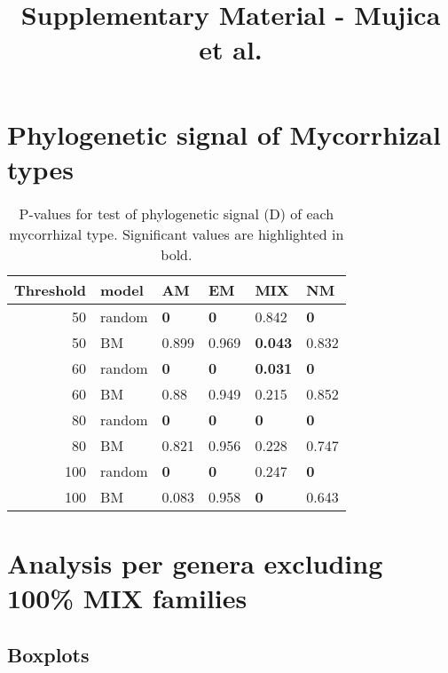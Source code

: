\documentclass[]{article}
\title{Supplementary Material - Mujica et al.}
\author{}
\date{}
\begin{document}
\maketitle

\hypertarget{phylogenetic-signal-of-mycorrhizal-types}{%
\section{Phylogenetic signal of Mycorrhizal
types}\label{phylogenetic-signal-of-mycorrhizal-types}}

\begin{table}[H]

\caption{\label{tab:unnamed-chunk-2}P-values for test of phylogenetic signal (D) of each mycorrhizal type. Significant values are highlighted in bold.}
\centering
\begin{tabular}{r|l|l|l|l|l}
\hline
Threshold & model & AM & EM & MIX & NM\\
\hline
50 & random & \textbf{0} & \textbf{0} & 0.842 & \textbf{0}\\
\hline
50 & BM & 0.899 & 0.969 & \textbf{0.043} & 0.832\\
\hline
60 & random & \textbf{0} & \textbf{0} & \textbf{0.031} & \textbf{0}\\
\hline
60 & BM & 0.88 & 0.949 & 0.215 & 0.852\\
\hline
80 & random & \textbf{0} & \textbf{0} & \textbf{0} & \textbf{0}\\
\hline
80 & BM & 0.821 & 0.956 & 0.228 & 0.747\\
\hline
100 & random & \textbf{0} & \textbf{0} & 0.247 & \textbf{0}\\
\hline
100 & BM & 0.083 & 0.958 & \textbf{0} & 0.643\\
\hline
\end{tabular}
\end{table}

\hypertarget{analysis-per-genera-excluding-100-mix-families}{%
\section{Analysis per genera excluding 100\% MIX
families}\label{analysis-per-genera-excluding-100-mix-families}}

\hypertarget{boxplots}{%
\subsection{Boxplots}\label{boxplots}}
\end{document}
